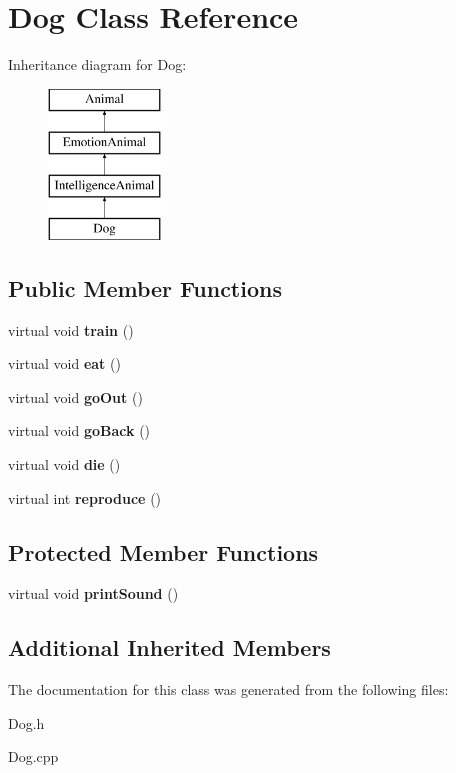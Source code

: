 \hypertarget{class_dog}{}\section{Dog Class Reference}
\label{class_dog}
Inheritance diagram for Dog\+:\begin{figure}[H]
\begin{center}
\leavevmode
\includegraphics[height=4.000000cm]{class_dog}
\end{center}
\end{figure}
\subsection*{Public Member Functions}
\begin{DoxyCompactItemize}
\item 
\mbox{\label{class_dog_aa3ac6ad4799963f3084b347cba19594e}} 
virtual void {\bfseries train} ()
\item 
\mbox{\label{class_dog_a03adeca9cd440ef988f9a07a41cc2f18}} 
virtual void {\bfseries eat} ()
\item 
\mbox{\label{class_dog_a32bc56294e6514c52d68b3e6ceb90768}} 
virtual void {\bfseries go\+Out} ()
\item 
\mbox{\label{class_dog_a41d697efa2242f02bd9a21605407f658}} 
virtual void {\bfseries go\+Back} ()
\item 
\mbox{\label{class_dog_a2d87cfdfd256fe56b0b83249dc11bdae}} 
virtual void {\bfseries die} ()
\item 
\mbox{\label{class_dog_a3b8fdd98742fea3b9e438538126edf6d}} 
virtual int {\bfseries reproduce} ()
\end{DoxyCompactItemize}
\subsection*{Protected Member Functions}
\begin{DoxyCompactItemize}
\item 
\mbox{\label{class_dog_a042e0f6390025ea229fdba51a60c2ca7}} 
virtual void {\bfseries print\+Sound} ()
\end{DoxyCompactItemize}
\subsection*{Additional Inherited Members}


The documentation for this class was generated from the following files\+:\begin{DoxyCompactItemize}
\item 
Dog.\+h\item 
Dog.\+cpp\end{DoxyCompactItemize}
